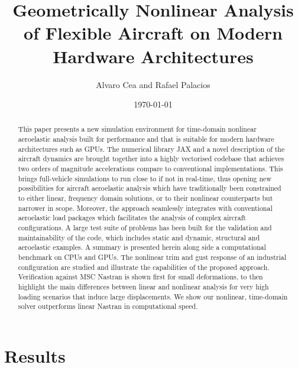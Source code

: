 \documentclass[11pt]{article}
\author{Alvaro Cea and Rafael Palacios}
\date{\today}
\title{Geometrically Nonlinear Analysis of Flexible Aircraft on Modern Hardware Architectures}
\begin{document}
\maketitle

\begin{abstract}
This paper presents a new simulation environment for time-domain nonlinear aeroelastic analysis built for performance and that is suitable for modern hardware architectures such as GPUs.
The numerical library JAX and a novel description of the aircraft dynamics are brought together into a highly vectorised codebase that achieves two orders of magnitude accelerations compare to conventional implementations. This brings full-vehicle simulations to run close to if not in real-time, thus opening new possibilities for aircraft aeroelastic analysis which have traditionally been constrained to either linear, frequency domain solutions, or to their nonlinear counterparts but narrower in scope. Moreover, the approach seamlessly integrates with conventional aeroelastic load packages which facilitates the analysis of complex aircraft configurations.
A large test suite of problems has been built for the validation and maintainability of the code, which includes static and dynamic, structural and aeroelastic examples. A summary is presented herein along side a computational benchmark on CPUs and GPUs.
The nonlinear trim and gust response of an industrial configuration are studied and illustrate the capabilities of the proposed approach. Verification against MSC Nastran is shown first for small deformations, to then highlight the main differences between linear and nonlinear analysis for very high loading scenarios that induce large displacements. We show our nonlinear, time-domain solver outperforms linear Nastran in computational speed. 
\end{abstract}

\section{Results}
\label{sec:org2660cd0}
\end{document}
